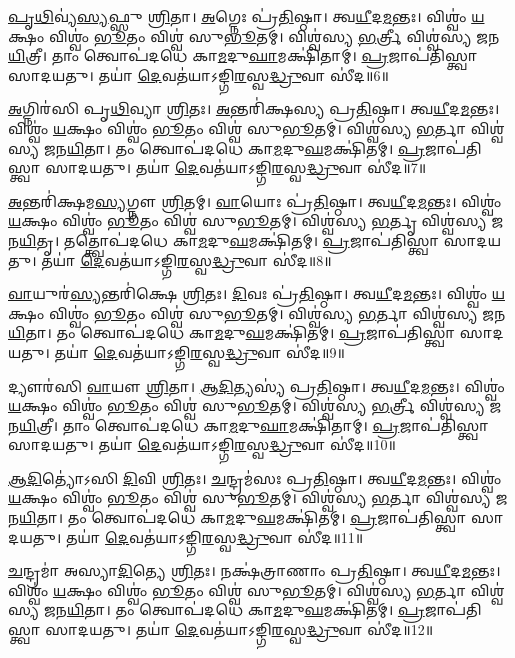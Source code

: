    \ul{𑌪𑍃}\ul{𑌥𑌿}𑌵𑍍𑌯॑\ul{𑌸𑍍𑌯}𑌫𑍍𑌸𑍁 \ul{𑌶𑍍𑌰𑌿}𑌤𑌾।
   \ul{𑌅}𑌗𑍍𑌨𑍇𑌃 𑌪𑍍𑌰॑\ul{𑌤𑌿}𑌷𑍍𑌠𑌾।
   𑌤𑍍𑌵\ul{𑌯𑍀}𑌦\ul{𑌮}𑌨𑍍𑌤𑌃।
   𑌵𑌿𑌶𑍍𑌵𑌂॑ \ul{𑌯}𑌕𑍍𑌷𑌂 𑌵𑌿𑌶𑍍𑌵𑌂॑ \ul{𑌭𑍂}𑌤𑌂 𑌵𑌿𑌶𑍍𑌵॑ 𑌸𑍁\ul{𑌭𑍂}𑌤𑌮𑍍।
   𑌵𑌿𑌶𑍍𑌵॑𑌸𑍍𑌯 \ul{𑌭}𑌰𑍍𑌤𑍍𑌰𑍀 𑌵𑌿𑌶𑍍𑌵॑𑌸𑍍𑌯 𑌜𑌨\ul{𑌯𑌿}𑌤𑍍𑌰𑍀।
   𑌤𑌾𑌂 𑌤𑍍𑌵𑍋𑌪॑𑌦𑌧𑍇 𑌕𑌾\ul{𑌮}𑌦𑍁\ul{𑌘𑌾}𑌮𑌕𑍍𑌷𑌿॑𑌤𑌾𑌮𑍍।
   \ul{𑌪𑍍𑌰}𑌜𑌾𑌪॑𑌤𑌿𑌸𑍍𑌤𑍍𑌵𑌾 𑌸𑌾𑌦𑌯𑌤𑍁।
   𑌤𑌯𑌾॑ \ul{𑌦𑍇}𑌵𑌤॑𑌯𑌾𑌽𑌙𑍍𑌗𑌿\ul{𑌰}𑌸𑍍𑌵\ul{𑌦𑍍𑌧𑍍𑌰𑍁}𑌵𑌾 𑌸𑍀॑𑌦॥6॥

   \ul{𑌅}𑌗𑍍𑌨𑌿𑌰॑𑌸𑌿 𑌪𑍃\ul{𑌥𑌿}𑌵𑍍𑌯𑌾 \ul{𑌶𑍍𑌰𑌿}𑌤𑌃।
   \ul{𑌅}𑌨𑍍𑌤𑌰𑌿॑𑌕𑍍𑌷𑌸𑍍𑌯 𑌪𑍍𑌰\ul{𑌤𑌿}𑌷𑍍𑌠𑌾।
   𑌤𑍍𑌵\ul{𑌯𑍀}𑌦\ul{𑌮}𑌨𑍍𑌤𑌃।
   𑌵𑌿𑌶𑍍𑌵𑌂॑ \ul{𑌯}𑌕𑍍𑌷𑌂 𑌵𑌿𑌶𑍍𑌵𑌂॑ \ul{𑌭𑍂}𑌤𑌂 𑌵𑌿𑌶𑍍𑌵॑ 𑌸𑍁\ul{𑌭𑍂}𑌤𑌮𑍍।
   𑌵𑌿𑌶𑍍𑌵॑𑌸𑍍𑌯 \ul{𑌭}𑌰𑍍𑌤𑌾 𑌵𑌿𑌶𑍍𑌵॑𑌸𑍍𑌯 𑌜𑌨\ul{𑌯𑌿}𑌤𑌾।
   𑌤𑌂 𑌤𑍍𑌵𑍋𑌪॑𑌦𑌧𑍇 𑌕𑌾\ul{𑌮}𑌦𑍁\ul{𑌘}𑌮𑌕𑍍𑌷𑌿॑𑌤𑌮𑍍।
   \ul{𑌪𑍍𑌰}𑌜𑌾𑌪॑𑌤𑌿𑌸𑍍𑌤𑍍𑌵𑌾 𑌸𑌾𑌦𑌯𑌤𑍁।
   𑌤𑌯𑌾॑ \ul{𑌦𑍇}𑌵𑌤॑𑌯𑌾𑌽𑌙𑍍𑌗𑌿\ul{𑌰}𑌸𑍍𑌵\ul{𑌦𑍍𑌧𑍍𑌰𑍁}𑌵𑌾 𑌸𑍀॑𑌦॥7॥

   \ul{𑌅}𑌨𑍍𑌤𑌰𑌿॑𑌕𑍍𑌷𑌮\ul{𑌸𑍍𑌯}𑌗𑍍𑌨𑍗 \ul{𑌶𑍍𑌰𑌿}𑌤𑌮𑍍।
   \ul{𑌵𑌾}𑌯𑍋𑌃 𑌪𑍍𑌰॑\ul{𑌤𑌿}𑌷𑍍𑌠𑌾।
   𑌤𑍍𑌵\ul{𑌯𑍀}𑌦\ul{𑌮}𑌨𑍍𑌤𑌃।
   𑌵𑌿𑌶𑍍𑌵𑌂॑ \ul{𑌯}𑌕𑍍𑌷𑌂 𑌵𑌿𑌶𑍍𑌵𑌂॑ \ul{𑌭𑍂}𑌤𑌂 𑌵𑌿𑌶𑍍𑌵॑ 𑌸𑍁\ul{𑌭𑍂}𑌤𑌮𑍍।
   𑌵𑌿𑌶𑍍𑌵॑𑌸𑍍𑌯 \ul{𑌭}𑌰𑍍𑌤𑍃 𑌵𑌿𑌶𑍍𑌵॑𑌸𑍍𑌯 𑌜𑌨\ul{𑌯𑌿}𑌤𑍃।
   𑌤𑌤𑍍𑌤𑍍𑌵𑍋𑌪॑𑌦𑌧𑍇 𑌕𑌾\ul{𑌮}𑌦𑍁\ul{𑌘}𑌮𑌕𑍍𑌷𑌿॑𑌤𑌮𑍍।
   \ul{𑌪𑍍𑌰}𑌜𑌾𑌪॑𑌤𑌿𑌸𑍍𑌤𑍍𑌵𑌾 𑌸𑌾𑌦𑌯𑌤𑍁।
   𑌤𑌯𑌾॑ \ul{𑌦𑍇}𑌵𑌤॑𑌯𑌾𑌽𑌙𑍍𑌗𑌿\ul{𑌰}𑌸𑍍𑌵\ul{𑌦𑍍𑌧𑍍𑌰𑍁}𑌵𑌾 𑌸𑍀॑𑌦॥8॥

   \ul{𑌵𑌾}𑌯𑍁𑌰॑\ul{𑌸𑍍𑌯}𑌨𑍍𑌤𑌰𑌿॑𑌕𑍍𑌷𑍇 \ul{𑌶𑍍𑌰𑌿}𑌤𑌃।
   \ul{𑌦𑌿}𑌵𑌃 𑌪𑍍𑌰॑\ul{𑌤𑌿}𑌷𑍍𑌠𑌾।
   𑌤𑍍𑌵\ul{𑌯𑍀}𑌦\ul{𑌮}𑌨𑍍𑌤𑌃।
   𑌵𑌿𑌶𑍍𑌵𑌂॑ \ul{𑌯}𑌕𑍍𑌷𑌂 𑌵𑌿𑌶𑍍𑌵𑌂॑ \ul{𑌭𑍂}𑌤𑌂 𑌵𑌿𑌶𑍍𑌵॑ 𑌸𑍁\ul{𑌭𑍂}𑌤𑌮𑍍।
   𑌵𑌿𑌶𑍍𑌵॑𑌸𑍍𑌯 \ul{𑌭}𑌰𑍍𑌤𑌾 𑌵𑌿𑌶𑍍𑌵॑𑌸𑍍𑌯 𑌜𑌨\ul{𑌯𑌿}𑌤𑌾।
   𑌤𑌂 𑌤𑍍𑌵𑍋𑌪॑𑌦𑌧𑍇 𑌕𑌾\ul{𑌮}𑌦𑍁\ul{𑌘}𑌮𑌕𑍍𑌷𑌿॑𑌤𑌮𑍍।
   \ul{𑌪𑍍𑌰}𑌜𑌾𑌪॑𑌤𑌿𑌸𑍍𑌤𑍍𑌵𑌾 𑌸𑌾𑌦𑌯𑌤𑍁।
   𑌤𑌯𑌾॑ \ul{𑌦𑍇}𑌵𑌤॑𑌯𑌾𑌽𑌙𑍍𑌗𑌿\ul{𑌰}𑌸𑍍𑌵\ul{𑌦𑍍𑌧𑍍𑌰𑍁}𑌵𑌾 𑌸𑍀॑𑌦॥9॥

   𑌦𑍍𑌯𑍗𑌰॑𑌸𑌿 \ul{𑌵𑌾}𑌯𑍗 \ul{𑌶𑍍𑌰𑌿}𑌤𑌾।
   \ul{𑌆}\ul{𑌦𑌿}𑌤𑍍𑌯𑌸𑍍𑌯॑ 𑌪𑍍𑌰\ul{𑌤𑌿}𑌷𑍍𑌠𑌾।
   𑌤𑍍𑌵\ul{𑌯𑍀}𑌦\ul{𑌮}𑌨𑍍𑌤𑌃।
   𑌵𑌿𑌶𑍍𑌵𑌂॑ \ul{𑌯}𑌕𑍍𑌷𑌂 𑌵𑌿𑌶𑍍𑌵𑌂॑ \ul{𑌭𑍂}𑌤𑌂 𑌵𑌿𑌶𑍍𑌵॑ 𑌸𑍁\ul{𑌭𑍂}𑌤𑌮𑍍।
   𑌵𑌿𑌶𑍍𑌵॑𑌸𑍍𑌯 \ul{𑌭}𑌰𑍍𑌤𑍍𑌰𑍀 𑌵𑌿𑌶𑍍𑌵॑𑌸𑍍𑌯 𑌜𑌨\ul{𑌯𑌿}𑌤𑍍𑌰𑍀।
   𑌤𑌾𑌂 𑌤𑍍𑌵𑍋𑌪॑𑌦𑌧𑍇 𑌕𑌾\ul{𑌮}𑌦𑍁\ul{𑌘𑌾}𑌮𑌕𑍍𑌷𑌿॑𑌤𑌾𑌮𑍍।
   \ul{𑌪𑍍𑌰}𑌜𑌾𑌪॑𑌤𑌿𑌸𑍍𑌤𑍍𑌵𑌾 𑌸𑌾𑌦𑌯𑌤𑍁।
   𑌤𑌯𑌾॑ \ul{𑌦𑍇}𑌵𑌤॑𑌯𑌾𑌽𑌙𑍍𑌗𑌿\ul{𑌰}𑌸𑍍𑌵\ul{𑌦𑍍𑌧𑍍𑌰𑍁}𑌵𑌾 𑌸𑍀॑𑌦॥10॥

   \ul{𑌆}\ul{𑌦𑌿}𑌤𑍍𑌯𑍋॑𑌽𑌸𑌿 \ul{𑌦𑌿}𑌵𑌿 \ul{𑌶𑍍𑌰𑌿}𑌤𑌃।
   \ul{𑌚}𑌨𑍍𑌦𑍍𑌰𑌮॑𑌸𑌃 𑌪𑍍𑌰\ul{𑌤𑌿}𑌷𑍍𑌠𑌾।
   𑌤𑍍𑌵\ul{𑌯𑍀}𑌦\ul{𑌮}𑌨𑍍𑌤𑌃।
   𑌵𑌿𑌶𑍍𑌵𑌂॑ \ul{𑌯}𑌕𑍍𑌷𑌂 𑌵𑌿𑌶𑍍𑌵𑌂॑ \ul{𑌭𑍂}𑌤𑌂 𑌵𑌿𑌶𑍍𑌵॑ 𑌸𑍁\ul{𑌭𑍂}𑌤𑌮𑍍।
   𑌵𑌿𑌶𑍍𑌵॑𑌸𑍍𑌯 \ul{𑌭}𑌰𑍍𑌤𑌾 𑌵𑌿𑌶𑍍𑌵॑𑌸𑍍𑌯 𑌜𑌨\ul{𑌯𑌿}𑌤𑌾।
   𑌤𑌂 𑌤𑍍𑌵𑍋𑌪॑𑌦𑌧𑍇 𑌕𑌾\ul{𑌮}𑌦𑍁\ul{𑌘}𑌮𑌕𑍍𑌷𑌿॑𑌤𑌮𑍍।
   \ul{𑌪𑍍𑌰}𑌜𑌾𑌪॑𑌤𑌿𑌸𑍍𑌤𑍍𑌵𑌾 𑌸𑌾𑌦𑌯𑌤𑍁।
   𑌤𑌯𑌾॑ \ul{𑌦𑍇}𑌵𑌤॑𑌯𑌾𑌽𑌙𑍍𑌗𑌿\ul{𑌰}𑌸𑍍𑌵\ul{𑌦𑍍𑌧𑍍𑌰𑍁}𑌵𑌾 𑌸𑍀॑𑌦॥11॥

   \ul{𑌚}𑌨𑍍𑌦𑍍𑌰𑌮𑌾॑ 𑌅𑌸𑍍𑌯𑌾\ul{𑌦𑌿}𑌤𑍍𑌯𑍇 \ul{𑌶𑍍𑌰𑌿}𑌤𑌃।
   𑌨𑌕𑍍𑌷॑𑌤𑍍𑌰𑌾𑌣𑌾𑌂 𑌪𑍍𑌰\ul{𑌤𑌿}𑌷𑍍𑌠𑌾।
   𑌤𑍍𑌵\ul{𑌯𑍀}𑌦\ul{𑌮}𑌨𑍍𑌤𑌃।
   𑌵𑌿𑌶𑍍𑌵𑌂॑ \ul{𑌯}𑌕𑍍𑌷𑌂 𑌵𑌿𑌶𑍍𑌵𑌂॑ \ul{𑌭𑍂}𑌤𑌂 𑌵𑌿𑌶𑍍𑌵॑ 𑌸𑍁\ul{𑌭𑍂}𑌤𑌮𑍍।
   𑌵𑌿𑌶𑍍𑌵॑𑌸𑍍𑌯 \ul{𑌭}𑌰𑍍𑌤𑌾 𑌵𑌿𑌶𑍍𑌵॑𑌸𑍍𑌯 𑌜𑌨\ul{𑌯𑌿}𑌤𑌾।
   𑌤𑌂 𑌤𑍍𑌵𑍋𑌪॑𑌦𑌧𑍇 𑌕𑌾\ul{𑌮}𑌦𑍁\ul{𑌘}𑌮𑌕𑍍𑌷𑌿॑𑌤𑌮𑍍।
   \ul{𑌪𑍍𑌰}𑌜𑌾𑌪॑𑌤𑌿𑌸𑍍𑌤𑍍𑌵𑌾 𑌸𑌾𑌦𑌯𑌤𑍁।
   𑌤𑌯𑌾॑ \ul{𑌦𑍇}𑌵𑌤॑𑌯𑌾𑌽𑌙𑍍𑌗𑌿\ul{𑌰}𑌸𑍍𑌵\ul{𑌦𑍍𑌧𑍍𑌰𑍁}𑌵𑌾 𑌸𑍀॑𑌦॥12॥

